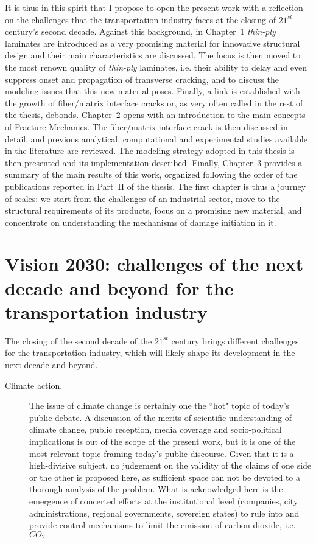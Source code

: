 It is thus in this spirit that I propose to open the present work with a reflection on the challenges that the transportation industry faces at the closing of $21^{st}$ century's second decade. Against this background, in Chapter~1 \emph{thin-ply} laminates are introduced as a very promising material for innovative structural design and their main characteristics are discussed. The focus is then moved to the most renown quality of \emph{thin-ply} laminates, i.e. their ability to delay and even suppress onset and propagation of transverse cracking, and to discuss the modeling issues that this new material poses. Finally, a link is established with the growth of fiber/matrix interface cracks or, as very often called in the rest of the thesis, debonds. Chapter~2 opens with an introduction to the main concepts of Fracture Mechanics. The fiber/matrix interface crack is then discussed in detail, and previous analytical, computational and experimental studies available in the literature are reviewed. The modeling strategy adopted in this thesis is then presented and its implementation described. Finally, Chapter~3 provides a summary of the main results of this work, organized following the order of the publications reported in Part~II of the thesis. The first chapter is thus a journey of scales: we start from the challenges of an industrial sector, move to the structural requirements of its products, focus on a promising new material, and concentrate on understanding the mechanisms of damage initiation in it.

\section{Vision 2030: challenges of the next decade and beyond for the transportation industry}

The closing of the second decade of the $21^{st}$ century brings different challenges for the transportation industry, which will likely shape its development in the next decade and beyond.

\begin{description}
\item[Climate action.] The issue of climate change is certainly one the ``hot" topic of today's public debate. A discussion of the merits of scientific understanding of climate change, public reception, media coverage and socio-political implications is out of the scope of the present work, but it is one of the most relevant topic framing today's public discourse. Given that it is a high-divisive subject, no judgement on the validity of the claims of one side or the other is proposed here, as sufficient space can not be devoted to a thorough analysis of the problem. What is acknowledged here is the emergence of concerted efforts at the institutional level (companies, city administrations, regional governments, sovereign states) to rule into and provide control mechanisms to limit the emission of carbon dioxide, i.e. $CO_{2}$
\end{description}
